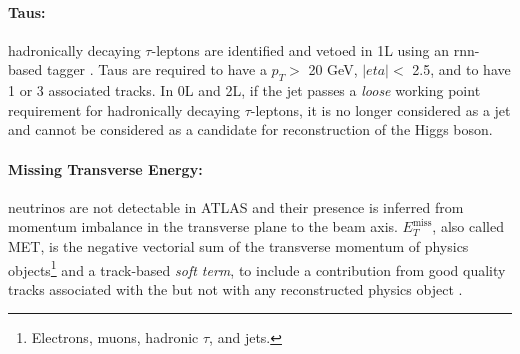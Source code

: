 \begin{table}[!htbp]
    \begin{center}
      \caption{Muon Selection requirements.} %
      \label{tbl:muonOb}
    \end{center}
  \end{table}
  
\paragraph{Taus:} hadronically decaying $\tau$-leptons are identified and vetoed in 1L using an \gls{rnn}-based tagger \cite{ATL-PHYS-PUB-2019-033}. Taus are required to have a $p_T >$ 20 GeV, $|eta| <$ 2.5, and to have 1 or 3 associated tracks. In 0L and 2L, if the jet passes a \textit{loose} working point requirement for hadronically decaying $\tau$-leptons, it is no longer considered as a jet and cannot be considered as a candidate for reconstruction of the Higgs boson. %

\paragraph{Missing Transverse Energy:} neutrinos are not detectable in ATLAS and their presence is inferred from momentum imbalance in the transverse plane to the beam axis. $E_T^{\textrm{miss}}$, also called MET, is the negative vectorial sum of the transverse momentum of physics objects\footnote{Electrons, muons, hadronic $\tau$, and jets.} and a track-based \textit{soft term}, to include a contribution from good quality tracks associated with the  but not with any reconstructed physics object \cite{ATLASmetReco}. %

